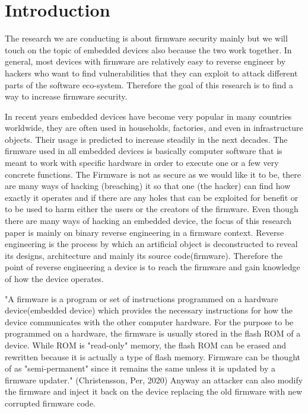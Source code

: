 \documentclass[]{report}
\begin{document}
\section{Introduction}
\begin{center}

The research we are conducting is about firmware security mainly but we will touch on the topic of embedded devices also because the two work together. In general, most devices with firmware are relatively easy to reverse engineer by hackers who want to find vulnerabilities that they can exploit to attack different parts of the software eco-system. Therefore the goal of this research is to find a way to increase firmware security.

In recent years embedded devices have become very popular in many countries worldwide, they are often used in households, factories, and even in infrastructure objects. Their usage is predicted to increase steadily in the next decades. The firmware used in all embedded devices is basically computer software that is meant to work with specific hardware in order to execute one or a few very concrete functions. The Firmware is not as secure as we would like it to be, there are many ways of hacking (breaching) it so that one (the hacker) can find how exactly it operates and if there are any holes that can be exploited for benefit or to be used to harm either the users or the creators of the firmware. Even though there are many ways of hacking an embedded device, the focus of this research paper is mainly on binary reverse engineering in a firmware context. Reverse engineering is the process by which an artificial object is deconstructed to reveal its designs, architecture and mainly its source code(firmware). Therefore the point of reverse engineering a device is to reach the firmware and gain knowledge of how the device operates.

"A firmware is a program or set of instructions programmed on a hardware device(embedded device) which provides the necessary instructions for how the device communicates with the other computer hardware. For the purpose to be programmed on a hardware, the firmware is usually stored in the flash ROM of a device. While ROM is "read-only" memory, the flash ROM can be erased and rewritten because it is actually a type of flash memory. Firmware can be thought of as "semi-permanent" since it remains the same unless it is updated by a firmware updater." (Christensson, Per, 2020) Anyway an attacker can also modify the firmware and inject it back on the device replacing the old firmware with new corrupted firmware code.


\end{center}
\end{document}
